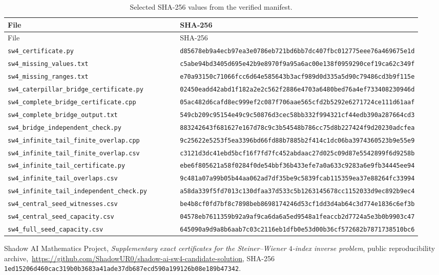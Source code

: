 \documentclass[11pt]{article}
\theoremstyle{definition}
\theoremstyle{remark}
\newcommand{\code}[1]{\nolinkurl{#1}}
\begin{document}
\begin{longtable}{@{}p{0.45\linewidth}p{0.49\linewidth}@{}}
\caption{Selected SHA-256 values from the verified manifest.}\\
\toprule
File & SHA-256\\
\midrule
\endfirsthead
\toprule
File & SHA-256\\
\midrule
\endhead
\code{sw4_certificate.py} &
\code{d85678eb9a4ecb97ea3e0786eb721bd6bb7dc407fbc012775eee76a469675e1d}\\
\code{sw4_missing_values.txt} &
\code{c5abe94bd3405d695e42b9e8970f9a95a6ac00e138f0959290cef19ca62c349f}\\
\code{sw4_missing_ranges.txt} &
\code{e70a93150c71066fcc6d64e585643b3acf989d0d335a5d90c79486cd3b9f115e}\\
\code{sw4_caterpillar_bridge_certificate.py} &
\code{02450eadd42abd1f182a2e2c562f2886e4703a6480bed76a4ef733408230946d}\\
\code{sw4_complete_bridge_certificate.cpp} &
\code{05ac482d6cafd8ec999ef2c087f706aae565cfd2b5292e6271724ce111d61aaf}\\
\code{sw4_complete_bridge_output.txt} &
\code{549cb209c95154e49c9c50876d3cec58bb332f994321cf44edb390a287664cd3}\\
\code{sw4_bridge_independent_check.py} &
\code{883242643f681627e167d78c9c3b54548b786cc75d8b227424f9d20230adcfea}\\
\code{sw4_infinite_tail_finite_overlap.cpp} &
\code{9c25622e5253f5ea3396bd66fd88b7885b2f414c1dc06ba3974360523b9e55e9}\\
\code{sw4_infinite_tail_finite_overlap.csv} &
\code{c3121d3dc41ebd5bcf16f7fd7fc452abdaac27d025c09d87e5542899f6d9258b}\\
\code{sw4_infinite_tail_certificate.py} &
\code{ebe6f805621a58f0284f0de54bbf36b433efe7a0a633c9283a6e9fb34445ee94}\\
\code{sw4_infinite_tail_overlaps.csv} &
\code{9c481a07a99b05b44aa062ad7df35be9c5839fcab115359ea37e88264fc33994}\\
\code{sw4_infinite_tail_independent_check.py} &
\code{a58da339f5fd7013c130dfaa37d533c5b1263145678cc1152033d9ec892b9ec4}\\
\code{sw4_central_seed_witnesses.csv} &
\code{be4b8cf0fd7bf8c7898beb8698174246d53cf1dd3d4ab64c3d774e1836c6ef3b}\\
\code{sw4_central_seed_capacity.csv} &
\code{04578eb7611359b92a9af9ca6da6a5ed9548a1feaccb2d7724a5e3b0b9903c47}\\
\code{sw4_full_seed_capacity.csv} &
\code{645090a9d9a8b6aab7c03c2116eb1dfb0e53d00b36cf572682b7871738510bc6}\\
\bottomrule
\end{longtable}

\begin{thebibliography}{1}
Shadow AI Mathematics Project,
\emph{Supplementary exact certificates for the Steiner--Wiener $4$-index
inverse problem}, public reproducibility archive,\
\url{https://github.com/ShadowUR0/shadow-ai-sw4-candidate-solution},
SHA-256
\texttt{1ed15206d460cac319b0b3683a41ade37db687ecd590a199126b08e189b47342}.
\end{thebibliography}
\end{document}
